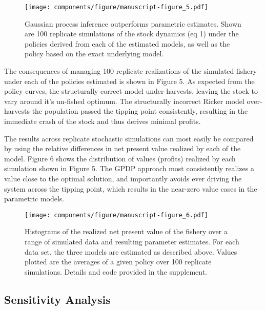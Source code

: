 \documentclass[author-year, 12pt,review]{elsarticle} %
\makeatletter
\def\maxwidth{\ifdim\Gin@nat@width>\linewidth\linewidth
\else\Gin@nat@width\fi}
\let\Oldincludegraphics\includegraphics
\renewcommand{\includegraphics}[1]{\Oldincludegraphics[width=\maxwidth]{#1}}
\makeatother
\begin{document}
\begin{figure}[htbp]
\centering
\texttt{[image: components/figure/manuscript-figure\_5.pdf]}
\caption{Gaussian process inference outperforms parametric estimates.
Shown are 100 replicate simulations of the stock dynamics (eq 1) under
the policies derived from each of the estimated models, as well as the
policy based on the exact underlying model.}
\end{figure}

The consequences of managing 100 replicate realizations of the simulated
fishery under each of the policies estimated is shown in Figure 5. As
expected from the policy curves, the structurally correct model
under-harvests, leaving the stock to vary around it's un-fished optimum.
The structurally incorrect Ricker model over-harvests the population
passed the tipping point consistently, resulting in the immediate crash
of the stock and thus derives minimal profits.

The results across replicate stochastic simulations can most easily be
compared by using the relative differences in net present value realized
by each of the model. Figure 6 shows the distribution of values
(profits) realized by each simulation shown in Figure 5. The GPDP
approach most consistently realizes a value close to the optimal
solution, and importantly avoids ever driving the system across the
tipping point, which results in the near-zero value cases in the
parametric models.

\begin{figure}[htbp]
\centering
\texttt{[image: components/figure/manuscript-figure\_6.pdf]}
\caption{Histograms of the realized net present value of the fishery
over a range of simulated data and resulting parameter estimates. For
each data set, the three models are estimated as described above. Values
plotted are the averages of a given policy over 100 replicate
simulations. Details and code provided in the supplement.}
\end{figure}

\subsection{Sensitivity Analysis}\label{sensitivity-analysis}
\end{document}
